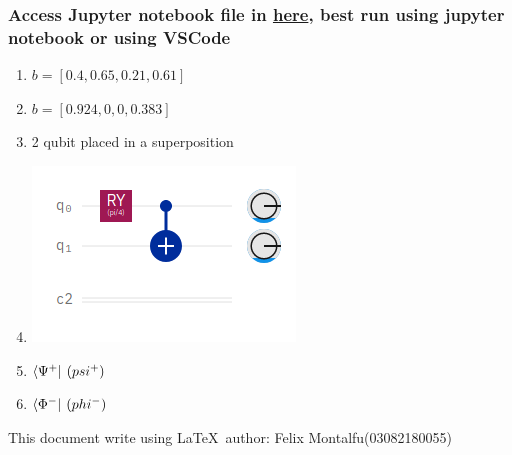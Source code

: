 \documentclass[a4paper]{article}
\begin{document}
    \subsubsection*{Access Jupyter notebook file in \href{run:../Answere/JupyterNotebook/}{here}, best run using jupyter notebook or using VSCode}
    \begin{enumerate}
        \item $b = [0.4,0.65,0.21,0.61]$
        \item $b = [0.924,0,0,0.383]$
        \item 2 qubit placed in a superposition
        \item \includegraphics{circuit-klnnmbgw.png}
        \item $\bra{\Psi^{+}}\hspace{2px}(psi^{+})$
        \item $\bra{\Phi^{-}}\hspace{2px}(phi^{-})$
    \end{enumerate}
This document write using \LaTeX \ author: Felix Montalfu(03082180055)
\end{document}
